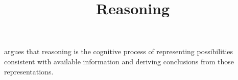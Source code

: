 \documentclass[a4paper]{standalone}
\title{Reasoning}
\begin{document}
   \maketitle

   \cite{johnson-laird-2010-mental-models-and-human-reasoning}
   argues that reasoning is the cognitive process of representing possibilities consistent with available information and deriving conclusions from those representations.
\end{document}
